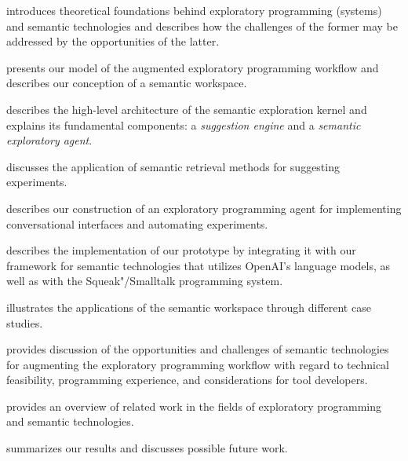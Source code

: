 \begin{description}[noextralabelsep]
	\item[\cref{cha:background}] introduces theoretical foundations behind exploratory programming (systems) and semantic technologies and describes how the challenges of the former may be addressed by the opportunities of the latter.
	\item[\cref{cha:approach}] presents our model of the augmented exploratory programming workflow and describes our conception of a semantic workspace.
	\item[\cref{cha:design}] describes the high-level architecture of the semantic exploration kernel and explains its fundamental components: a \emph{suggestion engine} and a \emph{semantic exploratory agent}.
	\item[\cref{cha:suggestions}] discusses the application of semantic retrieval methods for suggesting experiments.
	\item[\cref{cha:agent}] describes our construction of an exploratory programming agent for implementing conversational interfaces and automating experiments.
	\item[\cref{cha:implementation}] describes the implementation of our prototype by integrating it with our \semtex framework for semantic technologies that utilizes OpenAI's language models, as well as with the Squeak"/Smalltalk programming system.
	\item[\cref{cha:application}] illustrates the applications of the semantic workspace through different case studies.
	\item[\cref{cha:discussion}] provides discussion of the opportunities and challenges of semantic technologies for augmenting the exploratory programming workflow with regard to technical feasibility, programming experience, and considerations for tool developers.
	\item[\cref{cha:related_work}] provides an overview of related work in the fields of exploratory programming and semantic technologies.
	\item[\cref{cha:conclusion}] summarizes our results and discusses possible future work.
\end{description}

